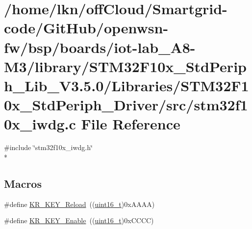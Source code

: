 \hypertarget{iot-lab___a8-_m3_2library_2_s_t_m32_f10x___std_periph___lib___v3_85_80_2_libraries_2_s_t_m32_f1095569183a2d89897cf081ada5eec6eb5}{}\section{/home/lkn/off\+Cloud/\+Smartgrid-\/code/\+Git\+Hub/openwsn-\/fw/bsp/boards/iot-\/lab\+\_\+\+A8-\/\+M3/library/\+S\+T\+M32\+F10x\+\_\+\+Std\+Periph\+\_\+\+Lib\+\_\+\+V3.5.0/\+Libraries/\+S\+T\+M32\+F10x\+\_\+\+Std\+Periph\+\_\+\+Driver/src/stm32f10x\+\_\+iwdg.c File Reference}
\label{iot-lab___a8-_m3_2library_2_s_t_m32_f10x___std_periph___lib___v3_85_80_2_libraries_2_s_t_m32_f1095569183a2d89897cf081ada5eec6eb5}
{\ttfamily \#include \char`\"{}stm32f10x\+\_\+iwdg.\+h\char`\"{}}\\*
\subsection*{Macros}
\begin{DoxyCompactItemize}
\item 
\#define \hyperlink{group___i_w_d_g___private___defines_gad5e5efc1dbd6a045da5a36c3d9df16a5}{K\+R\+\_\+\+K\+E\+Y\+\_\+\+Reload}~((\hyperlink{_p_e___types_8h_a1f1825b69244eb3ad2c7165ddc99c956}{uint16\+\_\+t})0x\+A\+A\+A\+A)
\item 
\#define \hyperlink{group___i_w_d_g___private___defines_ga833138e20c8a26786dd7ca3b132152ed}{K\+R\+\_\+\+K\+E\+Y\+\_\+\+Enable}~((\hyperlink{_p_e___types_8h_a1f1825b69244eb3ad2c7165ddc99c956}{uint16\+\_\+t})0x\+C\+C\+C\+C)
\end{DoxyCompactItemize}

